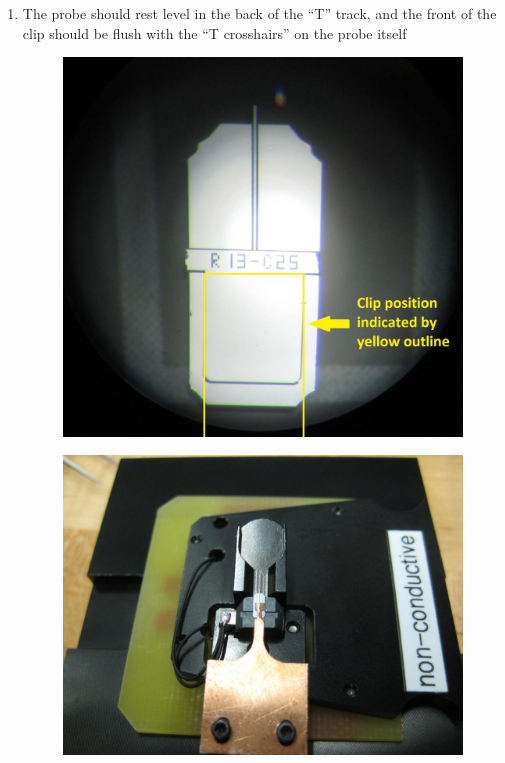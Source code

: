 \documentclass{../lab}
\begin{document}
\begin{enumerate}
    \item  The probe should rest level in the back of the ``T'' track, and the front of the clip should be flush with the ``T crosshairs'' on the probe itself
    
    \begin{figure}[H]
    \begin{minipage}[t]{.5\linewidth}
        \centering
        \href{http://experimentationlab.berkeley.edu/sites/default/files/AFMImages/23.JPG}{\includegraphics[width=0.8\linewidth,keepaspectratio]{images/23.JPG}}
        \caption{}
    \end{minipage}
    \begin{minipage}[t]{.5\linewidth}
        \centering
        \href{http://experimentationlab.berkeley.edu/sites/default/files/IMG_4053.JPG}{\includegraphics[width=0.8\linewidth,keepaspectratio]{images/IMG_4053.JPG}}
        \caption{}
    \end{minipage}
    \end{figure}
    

\end{enumerate}
\end{document}
